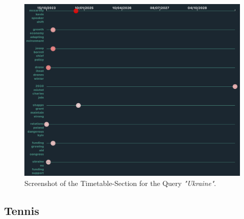 \documentclass[12pt,oneside,bibtotoc,liststotoc]{scrbook}
\begin{document}
\begin{figure}[H]
\centering
\includegraphics[width=\linewidth]{img/ukraine.png}
  \vspace{-0.5cm}
\caption{Screenshot of the Timetable-Section for the Query \textit{"Ukraine"}.}
\label{fig:results_ukraine}
\end{figure}

\subsection{Tennis}
\end{document}
